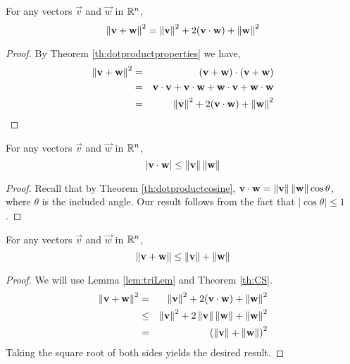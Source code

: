 \documentclass{ximera}
\begin{document}
\begin{lemma}\label{lem:triLem}
    For any vectors $\vec{v}$ and $\vec{w}$ in $\mathbb{R}^n$,
    \begin{equation}
\left\lVert\mathbf{v}+\mathbf{w}\right\rVert^2=\left\lVert\mathbf{v}\right\rVert^2+2(\mathbf{v}\cdot\mathbf{w})+\left\lVert\mathbf{w}\right\rVert^2
    \end{equation}
\end{lemma}
\begin{proof}
    By Theorem \ref{th:dotproductproperties} we have,
    \begin{eqnarray*}
        \left\lVert\mathbf{v}+\mathbf{w}\right\rVert^2 & = & (\mathbf{v}+\mathbf{w})\cdot (\mathbf{v}+\mathbf{w})\\
        &=& \mathbf{v}\cdot \mathbf{v}+\mathbf{v}\cdot\mathbf{w}+\mathbf{w}\cdot\mathbf{v}+\mathbf{w}\cdot\mathbf{w}\\
        &=&\left\lVert\mathbf{v}\right\rVert^2+ 2(\mathbf{v}\cdot\mathbf{w})+\left\lVert\mathbf{w}\right\rVert^2
    \end{eqnarray*}
\end{proof}

\begin{theorem}\label{th:CS}
    For any vectors $\vec{v}$ and $\vec{w}$ in $\mathbb{R}^n$,
    \begin{equation}
        |\mathbf{v}\cdot\mathbf{w}|\leq\left\lVert\mathbf{v}\right\rVert\left\lVert\mathbf{w}\right\rVert
    \end{equation}
\end{theorem}
\begin{proof}
    Recall that by Theorem \ref{th:dotproductcosine}, $\mathbf{v}\cdot\mathbf{w}=\left\lVert\mathbf{v}\right\rVert\left\lVert\mathbf{w}\right\rVert\cos\theta$, where $\theta$ is the included angle.  Our result follows from the fact that $|\cos\theta |\leq 1$.
\end{proof}

\begin{theorem}\label{th:TriIneq}
    For any vectors $\vec{v}$ and $\vec{w}$ in $\mathbb{R}^n$,
    \begin{equation}
        \left\lVert\mathbf{v}+\mathbf{w}\right\rVert\leq\left\lVert\mathbf{v}\right\rVert+\left\lVert\mathbf{w}\right\rVert
    \end{equation}
\end{theorem}
\begin{proof}
    We will use Lemma \ref{lem:triLem} and Theorem \ref{th:CS}.
    \begin{eqnarray*}
        \left\lVert\mathbf{v}+\mathbf{w}\right\rVert^2 &=& \left\lVert\mathbf{v}\right\rVert^2+2(\mathbf{v}\cdot\mathbf{w})+\left\lVert\mathbf{w}\right\rVert^2\\
        &\leq& \left\lVert\mathbf{v}\right\rVert^2+2\left\lVert\mathbf{v}\right\rVert\left\lVert\mathbf{w}\right\rVert+\left\lVert\mathbf{w}\right\rVert^2\\
        &=&\left(\left\lVert\mathbf{v}\right\rVert+\left\lVert\mathbf{w}\right\rVert\right)^2
    \end{eqnarray*}
    Taking the square root of both sides yields the desired result.
    
\end{proof}
\end{document}
